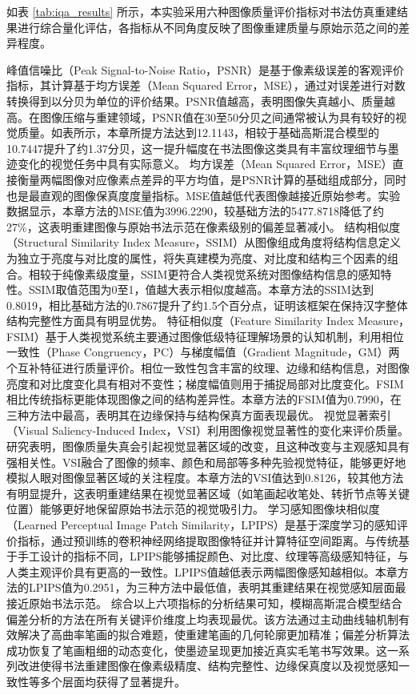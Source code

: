 如表 \ref{tab:iqa_results} 所示，本实验采用六种图像质量评价指标对书法仿真重建结果进行综合量化评估，各指标从不同角度反映了图像重建质量与原始示范之间的差异程度。

峰值信噪比（Peak Signal-to-Noise Ratio，PSNR）是基于像素级误差的客观评价指标，其计算基于均方误差（Mean Squared Error，MSE），通过对误差进行对数转换得到以分贝为单位的评价结果。PSNR值越高，表明图像失真越小、质量越高。在图像压缩与重建领域，PSNR值在30至50分贝之间通常被认为具有较好的视觉质量。如表所示，本章所提方法达到12.1143，相较于基础高斯混合模型的10.7447提升了约1.37分贝，这一提升幅度在书法图像这类具有丰富纹理细节与墨迹变化的视觉任务中具有实际意义。
均方误差（Mean Squared Error，MSE）直接衡量两幅图像对应像素点差异的平方均值，是PSNR计算的基础组成部分，同时也是最直观的图像保真度度量指标。MSE值越低代表图像越接近原始参考。实验数据显示，本章方法的MSE值为3996.2290，较基础方法的5477.8718降低了约27\%，这表明重建图像与原始书法示范在像素级别的偏差显著减小。
结构相似度（Structural Similarity Index Measure，SSIM）从图像组成角度将结构信息定义为独立于亮度与对比度的属性，将失真建模为亮度、对比度和结构三个因素的组合。相较于纯像素级度量，SSIM更符合人类视觉系统对图像结构信息的感知特性。SSIM取值范围为0至1，值越大表示相似度越高。本章方法的SSIM达到0.8019，相比基础方法的0.7867提升了约1.5个百分点，证明该框架在保持汉字整体结构完整性方面具有明显优势。
特征相似度（Feature Similarity Index Measure，FSIM）基于人类视觉系统主要通过图像低级特征理解场景的认知机制，利用相位一致性（Phase Congruency，PC）与梯度幅值（Gradient Magnitude，GM）两个互补特征进行质量评价。相位一致性包含丰富的纹理、边缘和结构信息，对图像亮度和对比度变化具有相对不变性；梯度幅值则用于捕捉局部对比度变化。FSIM相比传统指标更能体现图像之间的结构差异性。本章方法的FSIM值为0.7990，在三种方法中最高，表明其在边缘保持与结构保真方面表现最优。
视觉显著索引（Visual Saliency-Induced Index，VSI）利用图像视觉显著性的变化来评价质量。研究表明，图像质量失真会引起视觉显著区域的改变，且这种改变与主观感知具有强相关性。VSI融合了图像的频率、颜色和局部等多种先验视觉特征，能够更好地模拟人眼对图像显著区域的关注程度。本章方法的VSI值达到0.8126，较其他方法有明显提升，这表明重建结果在视觉显著区域（如笔画起收笔处、转折节点等关键位置）能够更好地保留原始书法示范的视觉吸引力。
学习感知图像块相似度（Learned Perceptual Image Patch Similarity，LPIPS）是基于深度学习的感知评价指标，通过预训练的卷积神经网络提取图像特征并计算特征空间距离。与传统基于手工设计的指标不同，LPIPS能够捕捉颜色、对比度、纹理等高级感知特征，与人类主观评价具有更高的一致性。LPIPS值越低表示两幅图像感知越相似。本章方法的LPIPS值为0.2951，为三种方法中最低值，表明其重建结果在视觉感知层面最接近原始书法示范。
综合以上六项指标的分析结果可知，模糊高斯混合模型结合偏差分析的方法在所有关键评价维度上均表现最优。该方法通过主动曲线轴机制有效解决了高曲率笔画的拟合难题，使重建笔画的几何轮廓更加精准；偏差分析算法成功恢复了笔画粗细的动态变化，使墨迹呈现更加接近真实毛笔书写效果。这一系列改进使得书法重建图像在像素级精度、结构完整性、边缘保真度以及视觉感知一致性等多个层面均获得了显著提升。

